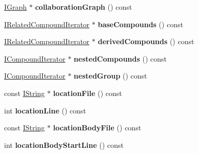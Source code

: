 \begin{DoxyCompactItemize}
\item 
\hypertarget{class_compound_handler_ae90be38977564ad7486bcb89b31fac7f}{\hyperlink{class_i_graph}{I\-Graph} $\ast$ {\bfseries collaboration\-Graph} () const }\label{class_compound_handler_ae90be38977564ad7486bcb89b31fac7f}

\item 
\hypertarget{class_compound_handler_a0d22bff00b5d9bb1c3957161638bb428}{\hyperlink{class_i_related_compound_iterator}{I\-Related\-Compound\-Iterator} $\ast$ {\bfseries base\-Compounds} () const }\label{class_compound_handler_a0d22bff00b5d9bb1c3957161638bb428}

\item 
\hypertarget{class_compound_handler_ac1d5de1d94d11ad1ede40ce178b3077f}{\hyperlink{class_i_related_compound_iterator}{I\-Related\-Compound\-Iterator} $\ast$ {\bfseries derived\-Compounds} () const }\label{class_compound_handler_ac1d5de1d94d11ad1ede40ce178b3077f}

\item 
\hypertarget{class_compound_handler_ac47414905db86943bb283b3075a71265}{\hyperlink{class_i_compound_iterator}{I\-Compound\-Iterator} $\ast$ {\bfseries nested\-Compounds} () const }\label{class_compound_handler_ac47414905db86943bb283b3075a71265}

\item 
\hypertarget{class_compound_handler_a70b66a204f763fca68b3518210f3714b}{\hyperlink{class_i_compound_iterator}{I\-Compound\-Iterator} $\ast$ {\bfseries nested\-Group} () const }\label{class_compound_handler_a70b66a204f763fca68b3518210f3714b}

\item 
\hypertarget{class_compound_handler_abce94f08d91f846fff0d9c15634735c8}{const \hyperlink{class_i_string}{I\-String} $\ast$ {\bfseries location\-File} () const }\label{class_compound_handler_abce94f08d91f846fff0d9c15634735c8}

\item 
\hypertarget{class_compound_handler_ae7a9a8fecbbcb367e094b035e86f600a}{int {\bfseries location\-Line} () const }\label{class_compound_handler_ae7a9a8fecbbcb367e094b035e86f600a}

\item 
\hypertarget{class_compound_handler_a21bb09533fb7679d628647320dd6fda4}{const \hyperlink{class_i_string}{I\-String} $\ast$ {\bfseries location\-Body\-File} () const }\label{class_compound_handler_a21bb09533fb7679d628647320dd6fda4}

\item 
\hypertarget{class_compound_handler_ad77f517c3f3a3e96f00a04ed465ae57f}{int {\bfseries location\-Body\-Start\-Line} () const }\label{class_compound_handler_ad77f517c3f3a3e96f00a04ed465ae57f}


\end{DoxyCompactItemize}
